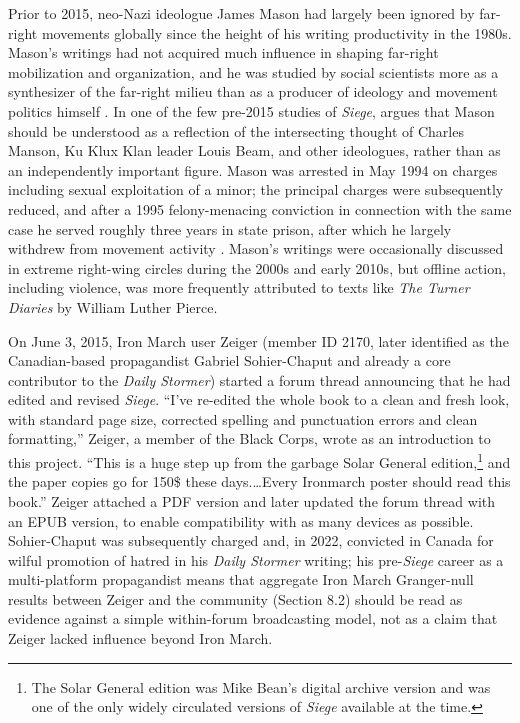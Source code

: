 \documentclass[bibtex,autowc,nonblind]{apsr_submission}
\begin{document}
Prior to 2015, neo-Nazi ideologue James Mason had largely been ignored by far-right movements globally since the height of his writing productivity in the 1980s. Mason's writings had not acquired much influence in shaping far-right mobilization and organization, and he was studied by social scientists more as a synthesizer of the far-right milieu than as a producer of ideology and movement politics himself \citep{johnson2023siege}. In one of the few pre-2015 studies of \textit{Siege}, \citet{goodrick2002black} argues that Mason should be understood as a reflection of the intersecting thought of Charles Manson, Ku Klux Klan leader Louis Beam, and other ideologues, rather than as an independently important figure. Mason was arrested in May 1994 on charges including sexual exploitation of a minor; the principal charges were subsequently reduced, and after a 1995 felony-menacing conviction in connection with the same case he served roughly three years in state prison, after which he largely withdrew from movement activity \citep{sunshine2024neo}. Mason's writings were occasionally discussed in extreme right-wing circles during the 2000s and early 2010s, but offline action, including violence, was more frequently attributed to texts like \textit{The Turner Diaries} by William Luther Pierce.

On June 3, 2015, Iron March user Zeiger (member ID 2170, later identified as the Canadian-based propagandist Gabriel Sohier-Chaput and already a core contributor to the \textit{Daily Stormer}) started a forum thread announcing that he had edited and revised \textit{Siege}. ``I've re-edited the whole book to a clean and fresh look, with standard page size, corrected spelling and punctuation errors and clean formatting,'' Zeiger, a member of the Black Corps, wrote as an introduction to this project. ``This is a huge step up from the garbage Solar General edition,\footnote{The Solar General edition was Mike Bean's digital archive version and was one of the only widely circulated versions of \textit{Siege} available at the time.} and the paper copies go for 150\$ these days.\ldots Every Ironmarch poster should read this book.'' Zeiger attached a PDF version and later updated the forum thread with an EPUB version, to enable compatibility with as many devices as possible. Sohier-Chaput was subsequently charged and, in 2022, convicted in Canada for wilful promotion of hatred in his \textit{Daily Stormer} writing; his pre-\textit{Siege} career as a multi-platform propagandist means that aggregate Iron March Granger-null results between Zeiger and the community (Section 8.2) should be read as evidence against a simple within-forum broadcasting model, not as a claim that Zeiger lacked influence beyond Iron March.
\end{document}
